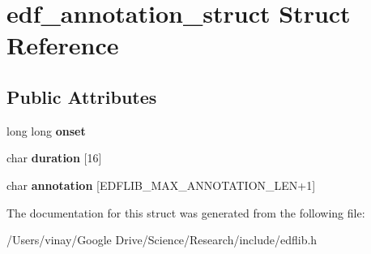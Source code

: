 \hypertarget{structedf__annotation__struct}{}\section{edf\+\_\+annotation\+\_\+struct Struct Reference}
\label{structedf__annotation__struct}
\subsection*{Public Attributes}
\begin{DoxyCompactItemize}
\item 
\hypertarget{structedf__annotation__struct_ac54860e2b855166947f8760f49672591}{}long long {\bfseries onset}\label{structedf__annotation__struct_ac54860e2b855166947f8760f49672591}

\item 
\hypertarget{structedf__annotation__struct_abb3db6f052ea92d1ce670ab93cf35dba}{}char {\bfseries duration} \mbox{[}16\mbox{]}\label{structedf__annotation__struct_abb3db6f052ea92d1ce670ab93cf35dba}

\item 
\hypertarget{structedf__annotation__struct_a4f858435fb3fc8117556570899db12e8}{}char {\bfseries annotation} \mbox{[}E\+D\+F\+L\+I\+B\+\_\+\+M\+A\+X\+\_\+\+A\+N\+N\+O\+T\+A\+T\+I\+O\+N\+\_\+\+L\+E\+N+1\mbox{]}\label{structedf__annotation__struct_a4f858435fb3fc8117556570899db12e8}

\end{DoxyCompactItemize}


The documentation for this struct was generated from the following file\+:\begin{DoxyCompactItemize}
\item 
/\+Users/vinay/\+Google Drive/\+Science/\+Research/include/edflib.\+h\end{DoxyCompactItemize}
